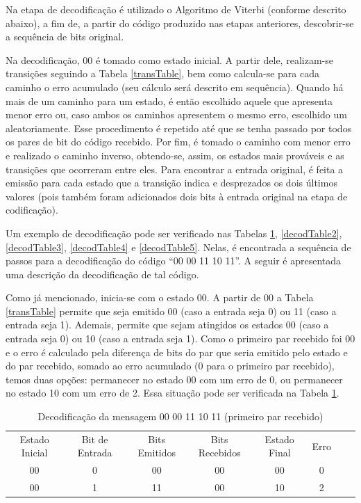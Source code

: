 \documentclass[12pt]{article}
\begin{document}
Na etapa de decodificação é utilizado o Algoritmo de Viterbi (conforme descrito abaixo), a fim de, a partir do código produzido nas etapas anteriores, descobrir-se a sequência de bits original.

Na decodificação, 00 é tomado como estado inicial. A partir dele, realizam-se transições seguindo a Tabela \ref{transTable}, bem como calcula-se para cada caminho o erro acumulado (seu cálculo será descrito em sequência). Quando há mais de um caminho para um estado, é então escolhido aquele que apresenta menor erro ou, caso ambos os caminhos apresentem o mesmo erro, escolhido um aleatoriamente. Esse procedimento é repetido até que se tenha passado por todos os pares de bit do código recebido. Por fim, é tomado o caminho com menor erro e realizado o caminho inverso, obtendo-se, assim, os estados mais prováveis e as transições que ocorreram entre eles. Para encontrar a entrada original, é feita a emissão para cada estado que a transição indica e desprezados os dois últimos valores (pois também foram adicionados dois bits à entrada original na etapa de codificação).

Um exemplo de decodificação pode ser verificado nas Tabelas \ref{decodTable1}, \ref{decodTable2}, \ref{decodTable3}, \ref{decodTable4} e \ref{decodTable5}. Nelas, é encontrada a sequência de passos para a decodificação do código ``00 00 11 10 11''. A seguir é apresentada uma descrição da decodificação de tal código.

Como já mencionado, inicia-se com o estado 00. A partir de 00 a Tabela \ref{transTable} permite que seja emitido 00 (caso a entrada seja 0) ou 11 (caso a entrada seja 1). Ademais, permite que sejam atingidos os estados 00 (caso a entrada seja 0) ou 10 (caso a entrada seja 1). Como o primeiro par recebido foi 00 e o erro é calculado pela diferença de bits do par que seria emitido pelo estado e do par recebido, somado ao erro acumulado (0 para o primeiro par recebido), temos duas opções: permanecer no estado 00 com um erro de 0, ou permanecer no estado 10 com um erro de 2. Essa situação pode ser verificada na Tabela \ref{decodTable1}.

\begin{table}[!ht]
\centering
\caption{Decodificação da mensagem 00 00 11 10 11 (primeiro par recebido)}
\label{decodTable1}
\def\arraystretch{1.2}
\begin{tabular}{cccccccc}
\multirow{2}{4.2em}{Estado Inicial} & \multirow{2}{4.2em}{Bit de Entrada} &  \multirow{2}{4.2em}{Bits Emitidos} & \multirow{2}{4.2em}{Bits Recebidos} & \multirow{2}{4.2em}{Estado Final} & \multirow{2}{4.2em}{Erro} \\&&&&&\\ \hline
 00 & 0 & 00 & 00 & 00 & 0 &\\
 00 & 1 & 11 & 00 & 10 & 2 &\\ \hline
\end{tabular}
\end{table}
\end{document}
